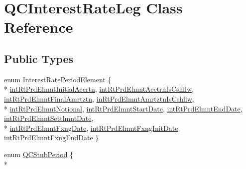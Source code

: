 \hypertarget{class_q_c_interest_rate_leg}{\section{Q\+C\+Interest\+Rate\+Leg Class Reference}
\label{class_q_c_interest_rate_leg}
}
\subsection*{Public Types}
\begin{DoxyCompactItemize}
\item 
enum \hyperlink{class_q_c_interest_rate_leg_aaf5f0b2b138054420ab36122c9c25b99}{Interest\+Rate\+Period\+Element} \{ \\*
\hyperlink{class_q_c_interest_rate_leg_aaf5f0b2b138054420ab36122c9c25b99adb68bac4242a6d92e0b32258e2374178}{int\+Rt\+Prd\+Elmnt\+Initial\+Accrtn}, 
\hyperlink{class_q_c_interest_rate_leg_aaf5f0b2b138054420ab36122c9c25b99ae5696afffdf64431db6f03390536fb7b}{int\+Rt\+Prd\+Elmnt\+Acctrn\+Is\+Cshflw}, 
\hyperlink{class_q_c_interest_rate_leg_aaf5f0b2b138054420ab36122c9c25b99ac33cac97014ef877fdd87ce9a20797fe}{int\+Rt\+Prd\+Elmnt\+Final\+Amrtztn}, 
\hyperlink{class_q_c_interest_rate_leg_aaf5f0b2b138054420ab36122c9c25b99a812899cd6f7a1d7244a26f206f98f047}{in\+Rt\+Prd\+Elmnt\+Amrtztn\+Is\+Cshflw}, 
\\*
\hyperlink{class_q_c_interest_rate_leg_aaf5f0b2b138054420ab36122c9c25b99a9bffb605f15732e7e888cf0e2b3c33b1}{int\+Rt\+Prd\+Elmnt\+Notional}, 
\hyperlink{class_q_c_interest_rate_leg_aaf5f0b2b138054420ab36122c9c25b99ad58f608be3d760380c5dc3cdf58ca9c1}{int\+Rt\+Prd\+Elmnt\+Start\+Date}, 
\hyperlink{class_q_c_interest_rate_leg_aaf5f0b2b138054420ab36122c9c25b99a8850291a9b820b354cacff7a265e4745}{int\+Rt\+Prd\+Elmnt\+End\+Date}, 
\hyperlink{class_q_c_interest_rate_leg_aaf5f0b2b138054420ab36122c9c25b99a96af13e603a08e6f62d610b55a9c5696}{int\+Rt\+Prd\+Elmnt\+Settlmnt\+Date}, 
\\*
\hyperlink{class_q_c_interest_rate_leg_aaf5f0b2b138054420ab36122c9c25b99a2bf64a7b74fc98b7213941d3600c4635}{int\+Rt\+Prd\+Elmnt\+Fxng\+Date}, 
\hyperlink{class_q_c_interest_rate_leg_aaf5f0b2b138054420ab36122c9c25b99ad6bb36e66d522f8d446edb2011b97665}{int\+Rt\+Prd\+Elmnt\+Fxng\+Init\+Date}, 
\hyperlink{class_q_c_interest_rate_leg_aaf5f0b2b138054420ab36122c9c25b99a44a363d2fa95639add756aacfa77b200}{int\+Rt\+Prd\+Elmnt\+Fxng\+End\+Date}
 \}
\item 
enum \hyperlink{class_q_c_interest_rate_leg_a70e636ef79eb9bc4c6b84ea526e56521}{Q\+C\+Stub\+Period} \{ \\*

\end{DoxyCompactItemize}
